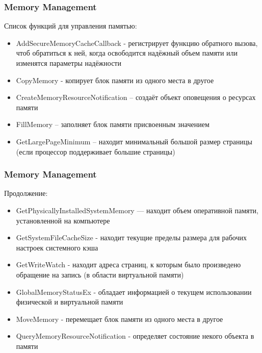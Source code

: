 \documentclass{beamer}
\begin{document}

\begin{frame}
\frametitle{Memory Management }

Список функций для управления памятью:
\begin{itemize}
\item AddSecureMemoryCacheCallback - регистрирует функцию обратного вызова, чтоб обратиться к ней, когда освободится надёжный объем памяти или изменятся параметры надёжности
\item CopyMemory - копирует блок памяти из одного места в другое
\item CreateMemoryResourceNotification – создаёт объект оповещения о ресурсах памяти
\item FillMemory – заполняет блок памяти присвоенным значением
\item GetLargePageMinimum – находит минимальный большой размер страницы (если процессор поддерживает большие страницы)
\end{itemize}

\end{frame}


\begin{frame}
\frametitle{Memory Management }

Продолжение:
\begin{itemize}
\item GetPhysicallyInstalledSystemMemory — находит объем оперативной памяти, установленной на компьютере
\item GetSystemFileCacheSize - находит текущие пределы размера для рабочих настроек системного кэша
\item GetWriteWatch - находит адреса страниц, к которым было произведено обращение на запись (в области виртуальной памяти)
\item GlobalMemoryStatusEx - обладает информацией о текущем использовании физической и виртуальной памяти
\item MoveMemory - перемещает блок памяти из одного места в другое
\item QueryMemoryResourceNotification - определяет состояние некого объекта в памяти
\end{itemize}

\end{frame}

\end{document}
